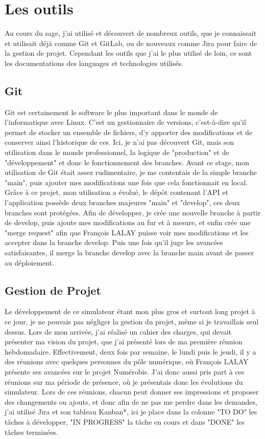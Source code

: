 \documentclass[a4paper,12pt]{report}
\begin{document}
\section{Les outils}
Au cours du sage, j'ai utilisé et découvert de nombreux outils, que je connaissait et utilisait déjà comme Git et GitLab, ou de nouveaux comme Jira pour faire de la gestion de projet. Cependant les outils que j'ai le plus utilisé de loin, ce sont les documentations des languages et technologies utilisés. 

\subsection{Git}
Git est certainement le software le plus important dans le monde de l'informatique avec Linux. C'est un gestionnaire de versions, c'est-à-dire qu'il permet de stocker un ensemble de fichiers, d'y apporter des modifications et de conserver ainsi l'historique de ces. Ici, je n'ai pas découvert Git, mais son utilisation dans le monde professionnel, la logique de "production" et de "développement" et donc le fonctionnement des branches. Avant ce stage, mon utilisation de Git était assez rudimentaire, je me contentais de la simple branche "main", puis ajouter mes modifications une fois que cela fonctionnait en local. Grâce à ce projet, mon utilisation a évolué, le dépôt contenant l'API et l'application possède deux branches majeures "main" et "develop", ces deux branches sont protégées. Afin de développer, je crée une nouvelle branche à partir de develop, puis ajoute mes modifications au fur et à mesure, et enfin crée une "merge request" afin que François LALAY puisse voir mes modifications et les accepter dans la branche develop. Puis une fois qu'il juge les avancées satisfaisantes, il merge la branche develop avec la branche main avant de passer au déploiement.

\subsection{Gestion de Projet}
Le développement de ce simulateur étant mon plus gros et surtout long projet à ce jour, je ne pouvais pas négliger la gestion du projet, même si je travaillais seul dessus. Lors de mon arrivée, j'ai réalisé un cahier des charges, qui devait présenter ma vision du projet, que j'ai présenté lors de ma première réunion hebdomadaire. Effectivement, deux fois par semaine, le lundi puis le jeudi, il y a des réunions avec quelques personnes du pôle numérique, où François LALAY présente ses avancées sur le projet Numérobis. J'ai donc aussi pris part à ces réunions sur ma période de présence, où je présentais donc les évolutions du simulateur. Lors de ces réunions, chacun peut donner ses impressions et proposer des changements ou ajouts, et donc afin de ne pas me perdre dans les demandes, j'ai utilisé Jira et son tableau Kanban*, ici je place dans la colonne "TO DO" les tâches à développer, "IN PROGRESS" la tâche en cours et dans "DONE" les tâches terminées.
\end{document}
